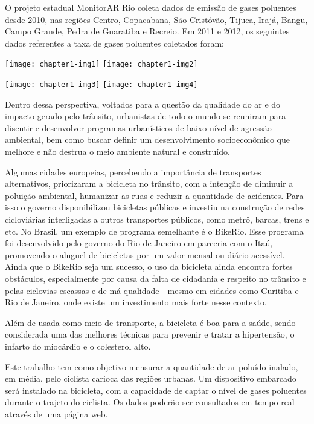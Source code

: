 O projeto estadual MonitorAR Rio coleta dados de emissão de gases poluentes desde 2010, 
nas regiões Centro, Copacabana, São Cristóvão, Tijuca, Irajá, Bangu, Campo Grande, 
Pedra de Guaratiba e Recreio. Em 2011 e 2012, os seguintes dados referentes a taxa de 
gases poluentes coletados foram:

\texttt{[image: chapter1-img1]}
\texttt{[image: chapter1-img2]}

\texttt{[image: chapter1-img3]}
\texttt{[image: chapter1-img4]}

Dentro dessa perspectiva, voltados para a questão da qualidade do ar e do impacto 
gerado pelo trânsito, urbanistas de todo o mundo se reuniram para discutir e desenvolver 
programas urbanísticos de baixo nível de agressão ambiental, bem como buscar definir um 
desenvolvimento socioeconômico que melhore e não destrua o meio ambiente natural e 
construído.

Algumas cidades europeias, percebendo a importância de transportes alternativos, 
priorizaram a bicicleta no trânsito, com a intenção de diminuir a poluição ambiental, 
humanizar as ruas e reduzir a quantidade de acidentes. Para isso o governo disponibilizou 
bicicletas públicas e investiu na construção de redes cicloviárias interligadas a outros 
transportes públicos, como metrô, barcas, trens e etc. No Brasil, um exemplo de programa 
semelhante é o BikeRio. Esse programa foi desenvolvido pelo governo do Rio de Janeiro em 
parceria com o Itaú, promovendo o aluguel de bicicletas por um valor mensal ou diário 
acessível. Ainda que o BikeRio seja um sucesso, o uso da bicicleta ainda encontra fortes 
obstáculos, especialmente por causa da falta de cidadania e respeito no trânsito e pelas 
ciclovias escassas e de má qualidade - mesmo em cidades como Curitiba e Rio de Janeiro, 
onde existe um investimento mais forte nesse contexto.

Além de usada como meio de transporte, a bicicleta é boa para a saúde, sendo considerada 
uma das melhores técnicas para prevenir e tratar a hipertensão, o infarto do miocárdio e 
o colesterol alto.

Este trabalho tem como objetivo mensurar a quantidade de ar poluído inalado, em média, pelo 
ciclista carioca das regiões urbanas. Um dispositivo embarcado será instalado na bicicleta, 
com a capacidade de captar o nível de gases poluentes durante o trajeto do ciclista. Os 
dados poderão ser consultados em tempo real através de uma página web.


